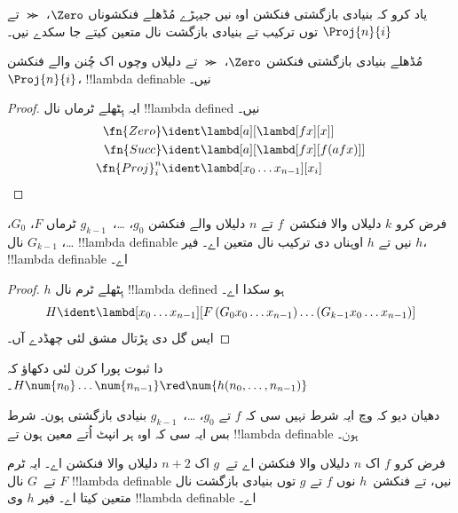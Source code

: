 \documentclass[../../../include/open-logic-section]{subfiles}
\begin{document}

یاد کرو کہ بنیادی بازگشتی فنکشن اوہ نیں جیہڑے مُڈھلے فنکشوناں
$\Zero$، $\Succ$ تے $\Proj{n}{i}$ توں ترکیب تے بنیادی بازگشت
نال متعین کیتے جا سکدے نیں۔

\begin{lem}
  مُڈھلے بنیادی بازگشتی فنکشن $\Zero$، $\Succ$ تے دلیلاں
  وچوں اک چُنن والے فنکشن~$\Proj{n}{i}$، !!{lambda definable} نیں۔
\end{lem}

\begin{proof}
ایہ ہِٹھلے ٹرماں نال !!{lambda defined} نیں۔
\begin{align*}
  \fn{Zero} & \ident \lambd[a][\lambd[fx][x]]\\
  \fn{Succ} & \ident \lambd[a][\lambd[fx][f (a f x)]] \\
  \fn{Proj}^n_i & \ident \lambd[x_0\dots x_{n-1}][x_i]
\end{align*}
\end{proof}

\begin{lem}
   فرض کرو $k$ دلیلاں والا فنکشن~$f$ تے
  $n$ دلیلاں والے فنکشن $g_0$، \dots،~$g_{k-1}$ ٹرماں
  $F$، $G_0$، \dots، $G_{k-1}$ نال !!{lambda definable} نیں تے
  $h$ اوہناں دی ترکیب نال متعین اے۔ فیر $h$، !!{lambda definable} اے۔
\end{lem}

\begin{proof}
  $h$ ہِٹھلے ٹرم نال !!{lambda defined} ہو سکدا اے۔
  \[
  H \ident \lambd[x_0 \dots x_{n-1}][F\, (G_0 x_0 \dots
    x_{n-1}) \dots (G_{k-1} x_0 \dots x_{n-1})]
  \]
  ایس گل دی پڑتال مشق لئی چھڈدے آں۔
\end{proof}

\begin{prob}
   دا ثبوت پورا کرن لئی دکھاؤ
  کہ $H\num{n_0}\dots\num{n_{n-1}} \red \num{h(n_0, \dots,
    n_{n-1})}$۔
\end{prob}

دھیان دیو کہ  وچ ایہ شرط نہیں سی کہ $f$
تے $g_0$، \dots،~$g_{k-1}$ بنیادی بازگشتی ہون۔ شرط بس ایہ
سی کہ اوہ ہر انپٹ اُتے معین ہون تے !!{lambda definable} ہون۔

\begin{lem}
  فرض کرو $f$ اک $n$ دلیلاں والا فنکشن اے تے~$g$ اک $n+2$
  دلیلاں والا فنکشن اے۔ ایہ ٹرم $F$ تے~$G$ نال !!{lambda definable}
  نیں، تے فنکشن~$h$ نوں $f$ تے $g$ توں بنیادی بازگشت نال
  متعین کیتا اے۔ فیر $h$ وی !!{lambda definable} اے۔
\end{lem}
\end{document}
